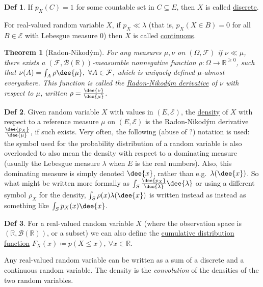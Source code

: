 \documentclass[a4paper]{article}
\newtheorem*{theorem}{Theorem}
\theoremstyle{definition}
\newtheorem*{definition}{Def}
\newcommand\gray[1]{{\color{gray}#1}}
\newcommand\key\uline%
\begin{document}
\begin{definition}
  If $p_X(C)=1$ for some countable set in $C \subseteq E$, then $X$ is called
  \key{discrete}.

  For real-valued random variable $X$, if $p_X\ll \lambda$
  (that is, $p_X(X\in B)=0$ for all $B \in \mathcal E$ with Lebesgue
  measure 0) then $X$ is called \key{continuous}.
\end{definition}

\begin{theorem}[Radon-Nikodým]
  For any measures $\mu, \nu$ on $(\Omega, \mathcal{F})$ if $\nu \ll \mu$, there
  exists a $(\mathcal{F}, \mathcal{B}(\mathbb{R}))$-measurable nonnegative
  function $\rho:\Omega\to\mathbb{R}^{\ge0}$, such that $\nu(A) = \int_A
  \rho\dee{\mu},\ \forall A\in \mathcal{F}$, which is uniquely defined
  $\mu$-almost everywhere. This function is called the
  \key{Radon-Nikodým derivative} of $\nu$ with respect to $\mu$, written  $\rho
  = \frac{\dee{\nu}}{\dee{\mu}}$.
\end{theorem}

\begin{definition}
  Given random variable $X$ with values in $(E,\mathcal{E})$, the
  \key{density} of $X$ with respect to a reference measure $\mu$ on
  $(E,\mathcal{E})$ is the Radon-Nikodým derivative
  $\frac{\dee{p_X}}{\dee{\mu}}$, if such exists.
  \gray{
    Very often, the following (abuse of ?) notation is used: the symbol used for
    the probability distribution of a random variable is also overloaded to also
    mean the density with respect to a dominating measure (usually the Lebesgue
    measure $\lambda$ when $E$ is the real numbers).
    Also, this dominating measure is simply denoted $\dee{x}$, rather
    than e.g.\ $\lambda(\dee{x})$.  So what might be written more formally as
    $\int_S \frac{\dee{p_X}}{\dee{\lambda}} \dee{\lambda}$ or using a different
    symbol $\rho_X$ for the density,
    $\int_S \rho(x) \lambda(\dee{x})$
    is written instead as instead as something like
    $\int_S p_X(x) \dee{x}$.
  }
\end{definition}

\gray{
  \begin{definition}
    For a real-valued random variable $X$ (where the observation space is
    $(\mathbb{R},\mathcal{B}(\mathbb{R}))$, or a subset) we can also define the
    \key{cumulative distribution function} $F_X(x) \coloneqq p(X\le x),\ \forall
    x\in \mathbb{R}$. 


    Any real-valued random variable can be written as a sum of a discrete and a
    continuous random variable.  The density is the \emph{convolution} of the
    densities of the two random variables.
  \end{definition}  
}
\end{document}
